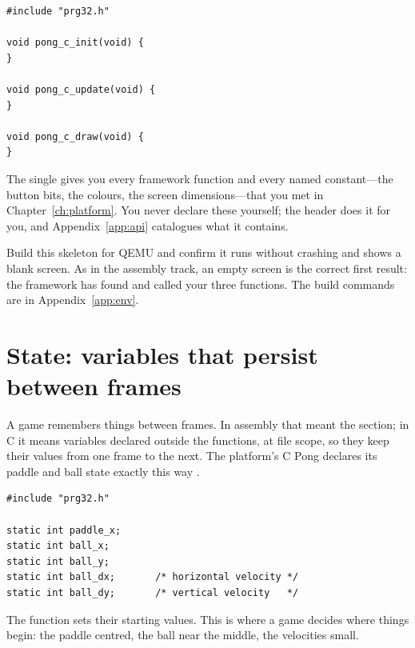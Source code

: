 \begin{lstlisting}[style=c,caption={The smallest C game. Three functions that do nothing yet---the C counterpart of the assembly skeleton in Chapter~\ref{ch:asm1}.}]
#include "prg32.h"

void pong_c_init(void) {
}

void pong_c_update(void) {
}

void pong_c_draw(void) {
}
\end{lstlisting}

The single  gives you every framework function and every
named constant---the button bits, the colours, the screen dimensions---that you
met in Chapter~\ref{ch:platform}. You never declare these yourself; the header does
it for you, and Appendix~\ref{app:api} catalogues what it contains.

\begin{prgcheck}
Build this skeleton for QEMU and confirm it runs without crashing and shows a
blank screen. As in the assembly track, an empty screen is the correct first
result: the framework has found and called your three functions. The build
commands are in Appendix~\ref{app:env}.
\end{prgcheck}

\section{State: variables that persist between frames}

A game remembers things between frames. In assembly that meant the 
section; in C it means variables declared outside the functions, at file scope,
so they keep their values from one frame to the next. The platform's C Pong
declares its paddle and ball state exactly this way \citep{prg32repo}.

\begin{lstlisting}[style=c,caption={Game state as file-scope variables. Declared outside the functions, they persist across frames. \texttt{static} keeps them private to this file.}]
#include "prg32.h"

static int paddle_x;
static int ball_x;
static int ball_y;
static int ball_dx;       /* horizontal velocity */
static int ball_dy;       /* vertical velocity   */
\end{lstlisting}

The  function sets their starting values. This is where a game decides
where things begin: the paddle centred, the ball near the middle, the velocities
small.

